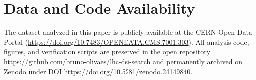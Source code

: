 \documentclass[11pt,a4paper]{article}
\begin{document}
\section*{Data and Code Availability}
The dataset analyzed in this paper is publicly available at the CERN Open Data Portal (\url{https://doi.org/10.7483/OPENDATA.CMS.7001.303}). All analysis code, figures, and verification scripts are preserved in the open repository \url{https://github.com/bruno-olivaes/lhc-dsi-search} and permanently archived on Zenodo under DOI \url{https://doi.org/10.5281/zenodo.24149840}.



\end{document}
